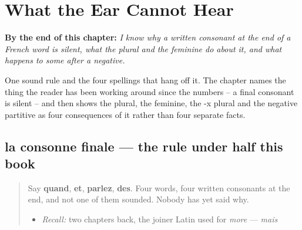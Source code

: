 
\chapter{What the Ear Cannot Hear}
\label{ch:fr-silent}

\begin{chapteropening}
\textbf{By the end of this chapter:} \emph{I know why a written consonant at the end of a French word is silent, what the plural and the feminine do about it, and what happens to some after a negative.}

One sound rule and the four spellings that hang off it. The chapter names the thing the reader has been working around since the numbers -- a final consonant is silent -- and then shows the plural, the feminine, the -x plural and the negative partitive as four consequences of it rather than four separate facts.
\end{chapteropening}

\section[la consonne finale]{la consonne finale — the rule under half this book}

\label{lesson:FR-C38-consonne-finale}



\begin{quote}
Say \textbf{quand}, \textbf{et}, \textbf{parlez}, \textbf{des}. Four words, four written consonants at the end, and not one of them sounded. Nobody has yet said why.

\begin{itemize}
\raggedright
  \item \emph{Recall:} two chapters back, the joiner Latin used for \emph{more} — \emph{mais}
\end{itemize}
\end{quote}

